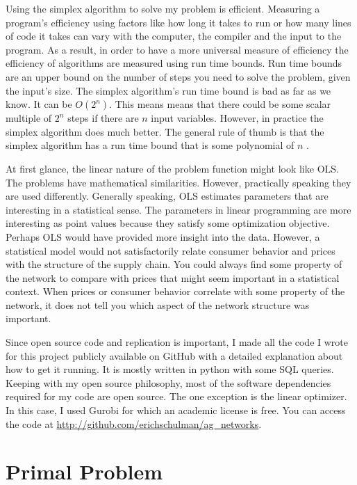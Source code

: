 \documentclass{report}
\begin{document}
Using the simplex algorithm to solve my problem is efficient. Measuring a program's efficiency using factors like how long it takes to run or how many lines of code it takes can vary with the computer, the compiler and the input to the program. As a result, in order to have a more universal measure of efficiency the efficiency of algorithms are measured using run time bounds. Run time bounds are an upper bound on the number of steps you need to solve the problem, given the input's size.  The simplex algorithm's run time bound is bad as far as we know. It can be $O(2^n)$. This means means that there could be some scalar multiple of $2^n$ steps if there are $n$ input variables. However, in practice the simplex algorithm does much better. The general rule of thumb is that the simplex algorithm has a run time bound that is some polynomial of $n$ \cite{Cook}.

At first glance, the  linear nature of the problem function might look like OLS. The problems have mathematical similarities. However, practically speaking they are used differently. Generally speaking, OLS estimates parameters that are interesting in a statistical sense.  The parameters in linear programming are more interesting as point values because they satisfy some optimization objective. Perhaps OLS would have provided more insight into the data. However, a statistical model would not satisfactorily relate consumer behavior and prices with the structure of the supply chain. You could always find some property of the network to compare with prices that might seem important in a statistical context. When prices or consumer behavior correlate with some property of the network, it does not tell you which aspect of the network structure was important.

Since open source code and replication is important, I made all the code I wrote for this project publicly available on GitHub with a detailed explanation about how to get it running. It is mostly written in python with some SQL queries. Keeping with my open source philosophy, most of the software dependencies required for my code are open source. The one exception is the linear optimizer. In this case, I used Gurobi for which an academic license is free. You can access the code at \url{http://github.com/erichschulman/ag_networks}.

\section{Primal Problem}
\end{document}
